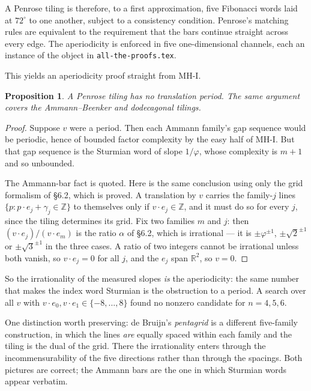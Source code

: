 \documentclass[11pt,a4paper]{article}
\newcommand{\Z}{\mathbb{Z}}
\newcommand{\R}{\mathbb{R}}
\theoremstyle{definition}
\theoremstyle{plain}
\newtheorem{proposition}[definition]{Proposition}
\begin{document}
A Penrose tiling is therefore, to a first approximation, five Fibonacci words
laid at $72^\circ$ to one another, subject to a consistency condition. Penrose's
matching rules are equivalent to the requirement that the bars continue straight
across every edge. The aperiodicity is enforced in five one-dimensional
channels, each an instance of the object in \texttt{all-the-proofs.tex}.

This yields an aperiodicity proof straight from MH-I.

\begin{proposition}\label{prop:aper}
A Penrose tiling has no translation period. The same argument covers the
Ammann--Beenker and dodecagonal tilings.
\end{proposition}

\begin{proof}
Suppose $v$ were a period. Then each Ammann family's gap sequence would be
periodic, hence of bounded factor complexity by the easy half of MH-I. But that
gap sequence is the Sturmian word of slope $1/\varphi$, whose complexity is
$m+1$ and so unbounded.

The Ammann-bar fact is quoted. Here is the same conclusion using only the grid
formalism of \S6.2, which is proved. A translation by $v$ carries the family-$j$
lines $\{p : p \cdot e_j + \gamma_j \in \Z\}$ to themselves only if
$v \cdot e_j \in \Z$, and it must do so for every $j$, since the tiling
determines its grid. Fix two families $m$ and $j$: then
$(v \cdot e_j)/(v \cdot e_m)$ is the ratio $\alpha$ of \S6.2, which is
irrational --- it is $\pm\varphi^{\pm 1}$, $\pm\sqrt 2^{\pm 1}$ or
$\pm\sqrt 3^{\pm 1}$ in the three cases. A ratio of two integers cannot be
irrational unless both vanish, so $v \cdot e_j = 0$ for all $j$, and the $e_j$
span $\R^2$, so $v = 0$.
\end{proof}

So the irrationality of the measured slopes \emph{is} the aperiodicity: the same
number that makes the index word Sturmian is the obstruction to a period. A
search over all $v$ with $v \cdot e_0, v \cdot e_1 \in \{-8,\dots,8\}$ found no
nonzero candidate for $n = 4, 5, 6$.

One distinction worth preserving: de Bruijn's \emph{pentagrid} is a different
five-family construction, in which the lines \emph{are} equally spaced within
each family and the tiling is the dual of the grid. There the irrationality
enters through the incommensurability of the five directions rather than through
the spacings. Both pictures are correct; the Ammann bars are the one in which
Sturmian words appear verbatim.
\end{document}
